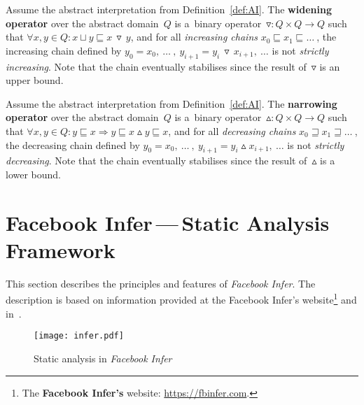 \begin{definition}
    Assume the abstract interpretation from Definition~\ref{def:AI}. The \textbf{widening operator} over the abstract domain~$ Q $ is a~binary operator~$ \triangledown : Q \times Q \rightarrow Q $ such that $ \forall x, y \in Q : x \sqcup y \sqsubseteq x\,\triangledown\,y $, and for all \emph{increasing chains} $ x_0 \sqsubseteq x_1 \sqsubseteq \ldots\ $, the increasing chain defined by $ y_0 = x_0,\ \ldots\ ,\ y_{i + 1} = y_i\,\triangledown\,x_{i + 1},\ \ldots $ is not \emph{strictly increasing}. Note that the chain eventually stabilises since the result of~$ \triangledown $ is an upper bound.
\end{definition}

\begin{definition}
    Assume the abstract interpretation from Definition~\ref{def:AI}. The \textbf{narrowing operator} over the abstract domain~$ Q $ is a~binary operator~$ \vartriangle : Q \times Q \rightarrow Q $ such that $ \forall x, y \in Q : y \sqsubseteq x \Longrightarrow y \sqsubseteq x \vartriangle y \sqsubseteq x $, and for all \emph{decreasing chains} $ x_0 \sqsupseteq x_1 \sqsupseteq \ldots\ $, the decreasing chain defined by $ y_0 = x_0,\ \ldots\ ,\ y_{i + 1} = y_i \vartriangle x_{i + 1},\ \ldots $ is not \emph{strictly decreasing}. Note that the chain eventually stabilises since the result of~$ \vartriangle $ is a lower bound.
\end{definition}


\section{\texorpdfstring{Facebook Infer\,---\,Static Analysis Framework}{Facebook Infer - Static Analysis Framework}}
\label{sec:fbinfer}

This section describes the principles and features of \emph{Facebook Infer}. The description is based on information provided at the Facebook Infer's website\footnote{The \textbf{Facebook Infer's} website: \url{https://fbinfer.com}.} and in~\cite{inferAISpeech}.

\begin{figure}[hbt]
    \centering
    \texttt{[image: infer.pdf]}
    \caption{Static analysis in \emph{Facebook Infer}}
    \label{fig:infer}
\end{figure}

